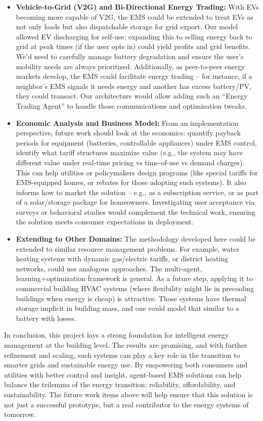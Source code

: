 \documentclass[12pt,a4paper]{article}
\begin{document}
\begin{itemize}
    \item \textbf{Vehicle-to-Grid (V2G) and Bi-Directional Energy Trading:} With EVs becoming more capable of V2G, the EMS could be extended to treat EVs as not only loads but also dispatchable storage for grid export. Our model allowed EV discharging for self-use; expanding this to selling energy back to grid at peak times (if the user opts in) could yield profits and grid benefits. We’d need to carefully manage battery degradation and ensure the user’s mobility needs are always prioritized. Additionally, as peer-to-peer energy markets develop, the EMS could facilitate energy trading – for instance, if a neighbor’s EMS signals it needs energy and another has excess battery/PV, they could transact. Our architecture would allow adding such an “Energy Trading Agent” to handle those communications and optimization tweaks.
    \item \textbf{Economic Analysis and Business Model:} From an implementation perspective, future work should look at the economics: quantify payback periods for equipment (batteries, controllable appliances) under EMS control, identify what tariff structures maximize value (e.g., the system may have different value under real-time pricing vs time-of-use vs demand charges). This can help utilities or policymakers design programs (like special tariffs for EMS-equipped homes, or rebates for those adopting such systems). It also informs how to market the solution – e.g., as a subscription service, or as part of a solar/storage package for homeowners. Investigating user acceptance via surveys or behavioral studies would complement the technical work, ensuring the solution meets consumer expectations in deployment.
    \item \textbf{Extending to Other Domains:} The methodology developed here could be extended to similar resource management problems. For example, water heating systems with dynamic gas/electric tariffs, or district heating networks, could use analogous approaches. The multi-agent, learning+optimization framework is general. As a future step, applying it to commercial building HVAC systems (where flexibility might lie in precooling buildings when energy is cheap) is attractive. Those systems have thermal storage implicit in building mass, and one could model that similar to a battery with losses. 
\end{itemize}


In conclusion, this project lays a strong foundation for intelligent energy management at the building level. The results are promising, and with further refinement and scaling, such systems can play a key role in the transition to smarter grids and sustainable energy use. By empowering both consumers and utilities with better control and insight, agent-based EMS solutions can help balance the trilemma of the energy transition: reliability, affordability, and sustainability. The future work items above will help ensure that this solution is not just a successful prototype, but a real contributor to the energy systems of tomorrow.
\end{document}

